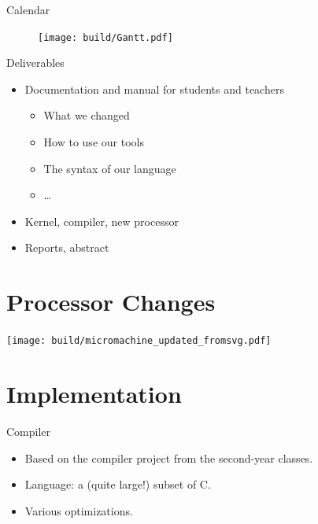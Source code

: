 \documentclass{beamer}
\begin{document}
      \begin{frame}{Calendar}
      \end{frame}

      \begin{frame}[plain]
        \begin{figure}
          \texttt{[image: build/Gantt.pdf]}
        \end{figure}
      \end{frame}

      \begin{frame}{Deliverables}
        \begin{itemize}
          \item Documentation and manual for students and teachers
            \begin{itemize}
              \item What we changed
              \item How to use our tools
              \item The syntax of our language
              \item \dots
            \end{itemize}
          \item Kernel, compiler, new processor
          \item Reports, abstract
        \end{itemize}
      \end{frame}

  \section{Processor Changes}
    \begin{landscape}
        \begin{frame}[plain]
            \texttt{[image: build/micromachine\_updated\_fromsvg.pdf]}

        \end{frame}
    \end{landscape}

  \section{Implementation}
    \begin{frame}{Compiler}
      \begin{itemize}
        \item Based on the compiler project from the second-year classes.
        \item Language: a (quite large!) subset of C.
        \item Various optimizations.
      \end{itemize}
    \end{frame}
\end{document}
